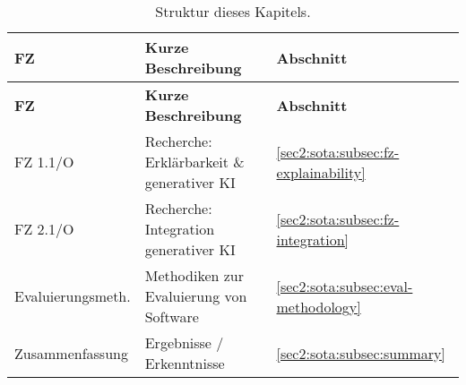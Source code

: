 {
    \def\arraystretch{1.1}%
    \begin{xltabular}{\linewidth}{
            @{}
            >{
                \linewidth
                \raggedright\arraybackslash
            }X
            >{
                \linewidth
                \raggedright\arraybackslash
            }X
            >{
                \linewidth
                \centering\arraybackslash
            }X
            @{}
    }


    \caption{Struktur dieses Kapitels.} 
    \label{sec2:sota:table:structure} \\
        
    \toprule

    \textbf{FZ} & \textbf{Kurze Beschreibung} & \textbf{Abschnitt} \\
    
    \midrule
    
    \endfirsthead


    \toprule

    \textbf{FZ} & \textbf{Kurze Beschreibung} & \textbf{Abschnitt} \\
    
    \midrule
    
    \endhead
        

    FZ 1.1/O & Recherche: Erklärbarkeit \& generativer KI & \cref{sec2:sota:subsec:fz-explainability} \\
    FZ 2.1/O & Recherche: Integration generativer KI & \cref{sec2:sota:subsec:fz-integration} \\ \midrule
    Evaluierungsmeth. & Methodiken zur Evaluierung von Software & \cref{sec2:sota:subsec:eval-methodology} \\
    Zusammenfassung & Ergebnisse / Erkenntnisse & \cref{sec2:sota:subsec:summary} \\
        
    \bottomrule 

    \end{xltabular}
}